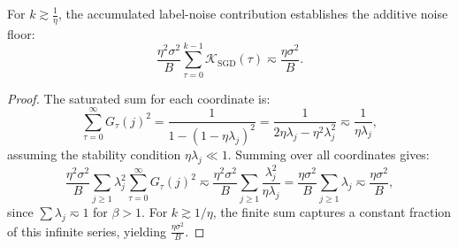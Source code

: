 \begin{lemma}
\label{lem:sgd_label_noise}
For $k \gtrsim \frac{1}{\eta}$, the accumulated label-noise contribution establishes the additive noise floor:
\begin{equation*}
    \frac{\eta^2 \sigma^2}{B} \sum_{\tau=0}^{k-1} \mathcal{K}_{\mathrm{SGD}}(\tau) \eqsim \frac{\eta \sigma^2}{B}.
\end{equation*}
\end{lemma}
\begin{proof}
The saturated sum for each coordinate is:
\[
    \sum_{\tau=0}^{\infty} G_\tau(j)^2 = \frac{1}{1 - (1-\eta\lambda_j)^2} = \frac{1}{2\eta\lambda_j - \eta^2\lambda_j^2} \eqsim \frac{1}{\eta\lambda_j},
\]
assuming the stability condition $\eta\lambda_j \ll 1$. Summing over all coordinates gives:
\[
    \frac{\eta^2 \sigma^2}{B} \sum_{j\ge 1} \lambda_j^2 \sum_{\tau=0}^{\infty} G_\tau(j)^2 \eqsim \frac{\eta^2 \sigma^2}{B} \sum_{j\ge 1} \frac{\lambda_j^2}{\eta\lambda_j} = \frac{\eta \sigma^2}{B} \sum_{j\ge 1} \lambda_j \eqsim \frac{\eta \sigma^2}{B},
\]
since $\sum \lambda_j \eqsim 1$ for $\beta > 1$. For $k \gtrsim 1/\eta$, the finite sum captures a constant fraction of this infinite series, yielding $\frac{\eta\sigma^2}{B}$.
\end{proof}

